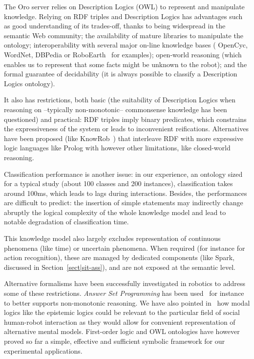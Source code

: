 \documentclass[preprint,3p,times]{elsarticle}
\begin{document}
The {\sc Oro} server relies on Description Logics (OWL) to represent and
manipulate knowledge. Relying on RDF triples and Description Logics has advantages such as good
understanding of its trades-off, thanks to being widespread in the semantic Web
community; the availability of mature libraries to manipulate the ontology;
interoperability with several major on-line knowledge bases ({\sc
OpenCyc}, {\sc WordNet}, {\sc DBPedia} or {\sc RoboEarth}~\cite{Waibel2011} for
examples); open-world reasoning (which enables us to represent that some facts
might be unknown to the robot); and the formal guarantee of decidability
(it is always possible to classify a Description Logics ontology).

It also has restrictions, both basic (the suitability of
Description Logics when reasoning on --typically non-monotonic-- commonsense
knowledge has been questioned) and practical: RDF triples imply binary
predicates, which constrains the expressiveness of the system or leads to
inconvenient reifications. Alternatives have been proposed (like {\sc
KnowRob}~\cite{Tenorth2009a}) that interleave RDF with more expressive logic languages
like {\sc Prolog} with however other limitations, like closed-world reasoning.

Classification performance is another issue: in our experience, an
ontology sized for a typical study (about 100 classes and 200 instances),
classification takes around 100ms, which leads to lags during
interactions.  Besides, the performances are difficult to predict: the insertion
of simple statements may indirectly change abruptly the logical
complexity of the whole knowledge model and lead to notable degradation of
classification time.

This knowledge model also largely excludes representation of continuous
phenomena (like time) or uncertain phenomena. When required (for instance for
action recognition), these are managed by dedicated components (like {\sc
Spark}, discussed in Section~\ref{sect|sit-ass}), and are not exposed at
the semantic level.

Alternative formalisms have been successfully investigated in robotics to
address some of these restrictions. \emph{Answer Set Programming} has been
used~\cite{Chen2010,Erdem2012} for instance to better supports non-monotonic
reasoning. We have also pointed in~\cite{lemaignan2015mutual} how modal logics like
the epistemic logics could be relevant to the particular field of social
human-robot interaction as they would allow for convenient representation of
alternative mental models. First-order logic and OWL ontologies have however
proved so far a simple, effective and sufficient symbolic framework for our
experimental applications. 
\end{document}
